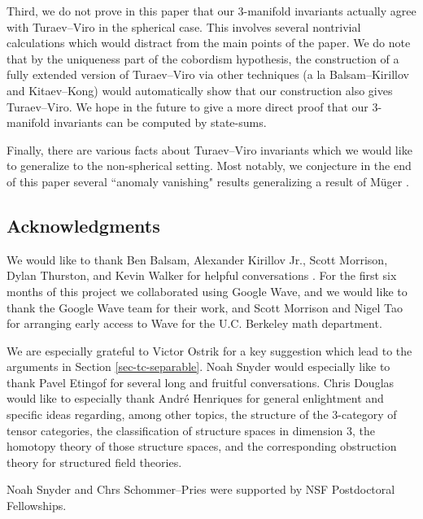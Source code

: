 \documentclass{amsart}
\begin{document}
Third, we do not prove in this paper that our $3$-manifold invariants actually agree with Turaev--Viro in the spherical case.  This involves several nontrivial calculations which would distract from the main points of the paper.  We do note that by the uniqueness part of the cobordism hypothesis, the construction of a fully extended version of Turaev--Viro via other techniques (a la Balsam--Kirillov and Kitaev--Kong) would automatically show that our construction also gives Turaev--Viro.  We hope in the future to give a more direct proof that our $3$-manifold invariants can be computed by state-sums. 

Finally, there are various facts about Turaev--Viro invariants which we would like to generalize to the non-spherical setting.  Most notably, we conjecture in the end of this paper several ``anomaly vanishing" results generalizing a result of M\"uger \cite{MR1966525}. 

\subsection*{Acknowledgments}
We would like to thank Ben Balsam, Alexander Kirillov Jr., Scott Morrison, Dylan Thurston, and Kevin Walker for helpful conversations .   For the first six months of this project we collaborated using Google Wave, and we would like to thank the Google Wave team for their work, and Scott Morrison and Nigel Tao for arranging early access to Wave for the U.C. Berkeley math department. 

We are especially grateful to Victor Ostrik for a key suggestion which lead to the arguments in Section \ref{sec-tc-separable}.  Noah Snyder would especially like to thank Pavel Etingof for several long and fruitful conversations.  Chris Douglas would like to especially thank Andr\'e Henriques for general enlightment and specific ideas regarding, among other topics, the structure of the 3-category of tensor categories, the classification of structure spaces in dimension 3,  the homotopy theory of those structure spaces, and the corresponding obstruction theory for structured field theories.

Noah Snyder and Chrs Schommer--Pries were supported by NSF Postdoctoral Fellowships.   
\end{document}
